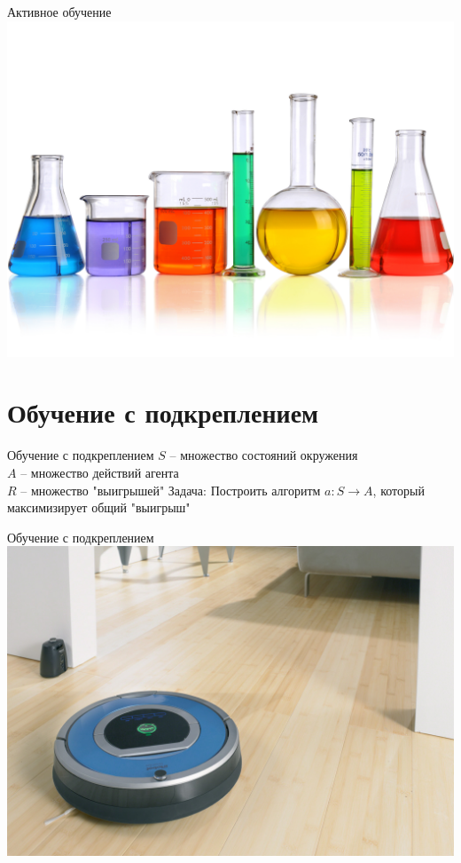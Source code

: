 \documentclass[10pt]{beamer}
\begin{document}
{
\begin{frame}{Активное обучение}
  \centering
  \includegraphics[width=0.9 \linewidth, height=0.9 \textheight, keepaspectratio]{images/active}\\
\end{frame}
}

\section{Обучение с подкреплением}

{
\begin{frame} {Обучение с подкреплением}
  $S$ -- множество состояний окружения\\
  $A$ -- множество действий агента\\
  $R$ -- множество "выигрышей"
  \bigbreak
	\bigbreak
	\alert{Задача}: Построить алгоритм ${a \colon S \rightarrow A}$, который максимизирует общий "выигрыш"
\end{frame}
}

{
\begin{frame} {Обучение с подкреплением}
  \centering
  \includegraphics[width=0.9 \linewidth, height=0.9 \textheight, keepaspectratio]{images/roomba}\\
\end{frame}
}
\end{document}
